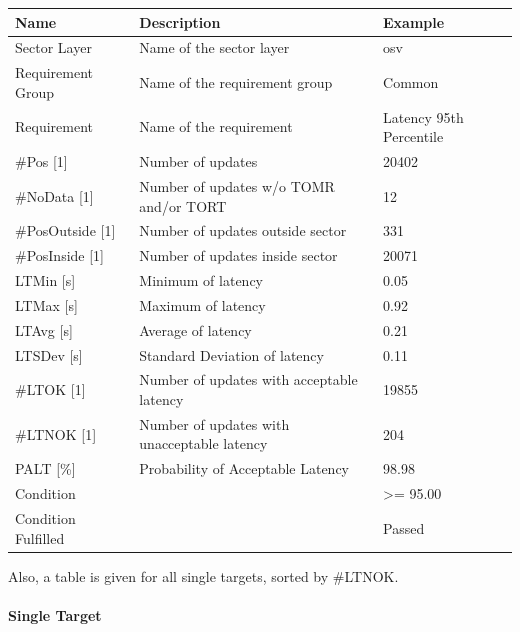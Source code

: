\begin{center}
 \begin{table}[H]
  \begin{tabularx}{\textwidth}{ | l | X |  l | }
    \hline
    \textbf{Name} & \textbf{Description} & \textbf{Example} \\ \hline
    Sector Layer & Name of the sector layer & osv \\ \hline
    Requirement Group & Name of the requirement group & Common  \\ \hline
    Requirement & Name of the requirement & Latency 95th Percentile  \\ \hline
    \#Pos [1] & Number of updates & 20402  \\ \hline
    \#NoData [1] & Number of updates w/o TOMR and/or TORT & 12  \\ \hline
    \#PosOutside [1] & Number of updates outside sector & 331  \\ \hline
    \#PosInside [1] & Number of updates inside sector & 20071  \\ \hline
    LTMin [s] & Minimum of latency & 0.05  \\ \hline
    LTMax [s] & Maximum of latency & 0.92  \\ \hline
    LTAvg [s] & Average of latency & 0.21  \\ \hline
    LTSDev [s] & Standard Deviation of latency & 0.11  \\ \hline
    \#LTOK [1] & Number of updates with acceptable latency & 19855  \\ \hline
    \#LTNOK [1] & Number of updates with unacceptable latency & 204  \\ \hline
    PALT [\%] & Probability of Acceptable Latency & 98.98  \\ \hline
    Condition &  & >= 95.00  \\ \hline
    Condition Fulfilled &  & Passed  \\ \hline
\end{tabularx}
\end{table}
\end{center}

Also, a table is given for all single targets, sorted by \#LTNOK.

\paragraph{Single Target}


